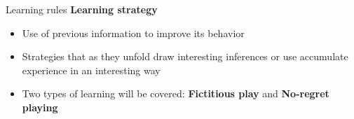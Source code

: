 \begin{frame}{Learning rules}
    \textbf{Learning strategy}
    \begin{itemize}
        \item Use of previous information to improve its behavior
        \item Strategies that as they unfold draw interesting inferences or use accumulate experience in an interesting way
        \item Two types of learning will be covered: \textbf{Fictitious play} and \textbf{No-regret playing}
    \end{itemize}
\end{frame}

\begin{comment}
\begin{frame}{Learning rules}
    \textbf{Two types of theories}
    \begin{itemize}
        \item Descriptive theories: theories that attempt to study the way learning takes place in real life
        \item Prescriptive theories: theories that study the way agents \textit{should} react in real life
    \end{itemize}
\end{frame}

\begin{frame}{Descriptive theories}
    \textbf{Properties}
    \begin{itemize}
        \item \textbf{Realism}: There should be a good match between the formal theory and the natural phenomenon being studied
        \item \textbf{Convergence}: The theory should exhibit convergence of the strategy profile to some equilibrium
    \end{itemize}
\end{frame}

\begin{frame}{Prescriptive theories}
    \textbf{Properties}
    \begin{itemize}
        \item \textbf{Safety}: Guarantees the agent at least learning rule its maxmin payoff, or “security value.”
        \item \textbf{Rationality}: Whenever the opponent's learning rule settles on a stationary strategy the agent settles on a best response to that strategy
        \item \textbf{No-regret}: Yields a better result that any pure strategy the agent could have played
    \end{itemize}
\end{frame}
\end{comment}
